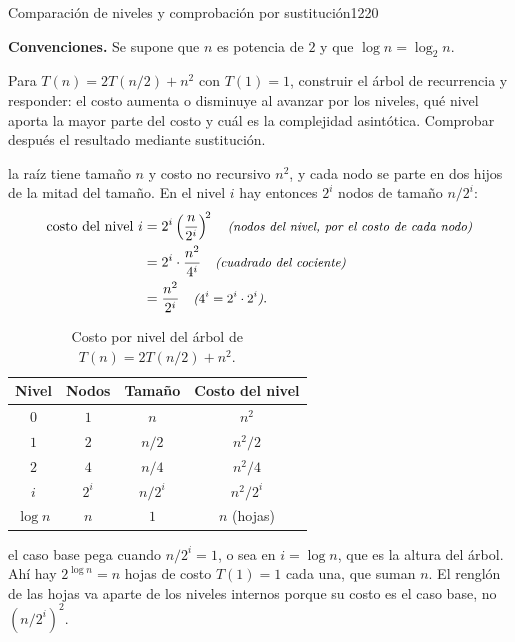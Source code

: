 \documentclass[11pt,letterpaper]{article}
\begin{document}
\encabezadoEjercicio
  {Comparación de niveles y comprobación por sustitución}{12}{20}

\noindent\textbf{Convenciones.}
Se supone que $n$ es potencia de $2$ y que
$\log n = \log_2 n$.

\noindent Para $T(n) = 2T(n/2) + n^2$ con $T(1) = 1$, construir el
árbol de recurrencia y responder: el costo aumenta o disminuye al
avanzar por los niveles, qué nivel aporta la mayor parte del costo y
cuál es la complejidad asintótica. Comprobar después el resultado
mediante sustitución.

 la raíz tiene tamaño $n$ y costo no
recursivo $n^2$, y cada nodo se parte en dos hijos de la mitad del
tamaño. En el nivel $i$ hay entonces $2^{i}$ nodos de tamaño
$n/2^{i}$:
\begin{align*}
  \text{costo del nivel } i
    &= 2^{i} \left(\frac{n}{2^{i}}\right)^{\!2}
       \quad\text{\small\itshape (nodos del nivel, por el costo de cada nodo)} \\
    &= 2^{i} \cdot \frac{n^{2}}{4^{i}}
       \quad\text{\small\itshape (cuadrado del cociente)} \\
    &= \frac{n^{2}}{2^{i}}
       \quad\text{\small\itshape ($4^{i} = 2^{i} \cdot 2^{i}$)}.
\end{align*}

\begin{table}[H]
  \centering
  \begin{tabular}{cccc}
    \toprule
    \textbf{Nivel} & \textbf{Nodos} & \textbf{Tamaño}
      & \textbf{Costo del nivel} \\
    \midrule
    $0$      & $1$     & $n$       & $n^{2}$ \\
    $1$      & $2$     & $n/2$     & $n^{2}/2$ \\
    $2$      & $4$     & $n/4$     & $n^{2}/4$ \\
    $i$      & $2^{i}$ & $n/2^{i}$ & $n^{2}/2^{i}$ \\
    $\log n$ & $n$     & $1$       & $n$ \quad (hojas) \\
    \bottomrule
  \end{tabular}
  \caption{Costo por nivel del árbol de $T(n) = 2T(n/2) + n^2$.}
  \label{ej12-niveles}
\end{table}

 el caso base pega cuando $n/2^{i} = 1$, o sea
en $i = \log n$, que es la altura del árbol. Ahí hay
$2^{\log n} = n$ hojas de costo $T(1) = 1$ cada una, que suman $n$.
El renglón de las hojas va aparte de los niveles internos porque su
costo es el caso base, no $(n/2^{i})^{2}$.
\end{document}
